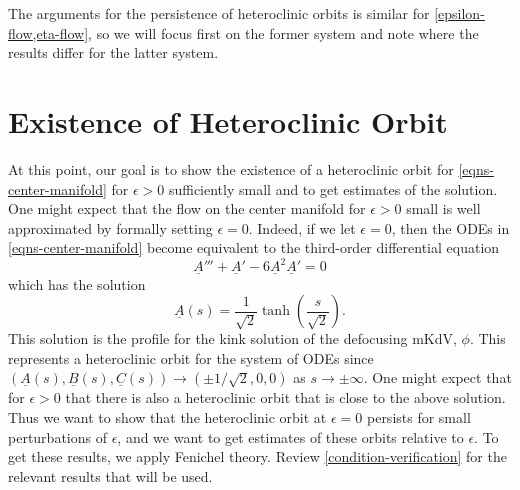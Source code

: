 The arguments for the persistence of heteroclinic orbits is similar for \cref{epsilon-flow,eta-flow}, so we will focus first on the former system and note where the results differ for the latter system.
\section{Existence of Heteroclinic Orbit}



At this point, our goal is to show the existence of a heteroclinic orbit for \cref{eqns-center-manifold} for \(\epsilon>0\) sufficiently small and to get estimates of the solution. One might expect that the flow on the center manifold for \(\epsilon>0\) small is well approximated by formally setting \(\epsilon = 0\). Indeed, if we let \(\epsilon = 0\), then the ODEs in \cref{eqns-center-manifold} become equivalent to the third-order differential equation
\begin{equation}
	\underline A ''' + \underline A'  - 6 \underline A^2 \underline A' = 0 
\end{equation}
which has the solution 
\begin{equation}
	\underline A(s) = \frac 1 {\sqrt 2} \tanh\left(\frac s {\sqrt 2}\right).
\end{equation}
This solution is the profile for the kink solution of the defocusing mKdV, \(\phi\). This represents a heteroclinic orbit for the system of ODEs since \((\underline A(s), \underline B(s), \underline C(s)) \to (\pm1/\sqrt 2, 0, 0)\) as \(s\to\pm \infty.\) One might expect that for \(\epsilon > 0\) that there is also a heteroclinic orbit that is close to the above solution. Thus we want to show that the heteroclinic orbit at \(\epsilon = 0\) persists for small perturbations of \(\epsilon\), and we want to get estimates of these orbits relative to \(\epsilon\). To get these results, we apply Fenichel theory. Review \cref{condition-verification} for the relevant results that will be used.

